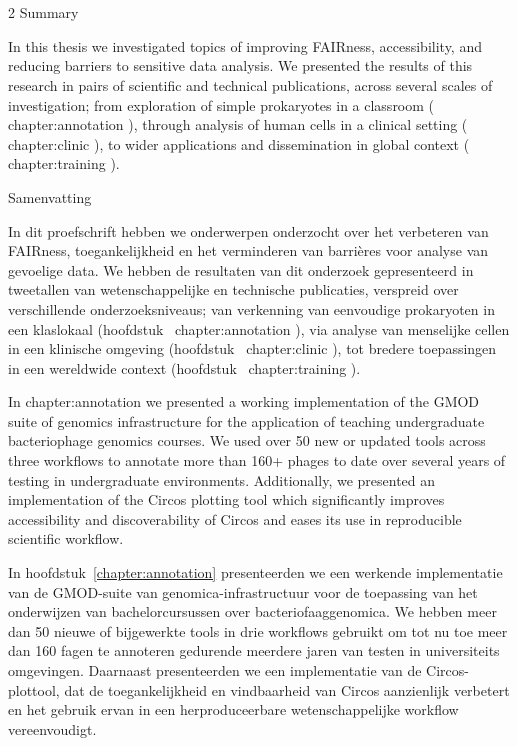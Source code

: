 \documentclass[School=EMC,Draft]{Dissertate}
\begin{document}
\chapter{}


\begin{paracol}{2}%
{\Huge Summary}

In this thesis we investigated topics of improving FAIRness, accessibility, and reducing barriers to sensitive data analysis.
We presented the results of this research in pairs of scientific and technical publications, across several scales of investigation; from exploration of simple prokaryotes in a classroom ( chapter:annotation ), through analysis of human cells in a clinical setting ( chapter:clinic ), to wider applications and dissemination in global context ( chapter:training ).

\switchcolumn

{\Huge Samenvatting}

In dit proefschrift hebben we onderwerpen onderzocht over het verbeteren van FAIRness, toegankelijkheid en het verminderen van barrières voor analyse van gevoelige data.
We hebben de resultaten van dit onderzoek gepresenteerd in tweetallen van wetenschappelijke en technische publicaties, verspreid over verschillende onderzoeksniveaus; van verkenning van eenvoudige prokaryoten in een klaslokaal (hoofdstuk~ chapter:annotation ), via analyse van menselijke cellen in een klinische omgeving (hoofdstuk~ chapter:clinic ), tot bredere toepassingen in een wereldwide context (hoofdstuk~ chapter:training ).

\switchcolumn*  %

In {chapter:annotation} we presented a working implementation of the GMOD suite of genomics infrastructure for the application of teaching undergraduate bacteriophage genomics courses.
We used over 50 new or updated tools across three workflows to annotate more than 160+ phages to date over several years of testing in undergraduate environments.
Additionally, we presented an implementation of the Circos plotting tool which significantly improves accessibility and discoverability of Circos and eases its use in reproducible scientific workflow.

\switchcolumn

In hoofdstuk~\ref{chapter:annotation} presenteerden we een werkende implementatie van de GMOD-suite van genomica-infrastructuur voor de toepassing van het onderwijzen van bachelorcursussen over bacteriofaaggenomica.
We hebben meer dan 50 nieuwe of bijgewerkte tools in drie workflows gebruikt om tot nu toe meer dan 160 fagen te annoteren gedurende meerdere jaren van testen in universiteits omgevingen.
Daarnaast presenteerden we een implementatie van de Circos-plottool, dat de toegankelijkheid en vindbaarheid van Circos aanzienlijk verbetert en het gebruik ervan in een herproduceerbare wetenschappelijke workflow vereenvoudigt.


\end{paracol}
\end{document}

